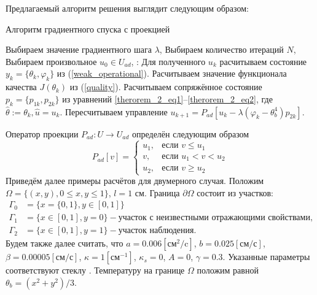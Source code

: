 \documentclass[10pt]{article}
\begin{document}
    Предлагаемый алгоритм решения выглядит следующим образом:
    \begin{algorithm}[H]
        \caption{Алгоритм градиентного спуска с проекцией}
        \begin{algorithmic}[1]
            \State Выбираем значение градиентного шага $\lambda$,
            \State Выбираем количество итераций $N$,
            \State Выбираем произвольное $u_0 \in U_{ad}$,
                :
                \State Для полученного $u_k$ расчитываем состояние $y_k = \{\theta_k, \varphi_k\}$ из  (\ref{weak_operational}).
                \State Расчитываем значение функционала качества $J(\theta_k)$ из (\ref{quality}).
                \State Расчитываем сопряжённое состояние $p_k=\{p_{1k},p_{2k}\}$ из уравнений \eqref{therorem_2_eq1}--\eqref{therorem_2_eq2}, где $ \hat{\theta} := \theta_k, \hat{u}=u_k$.
                \State Пересчитываем управление $u_{k+1} = P_{ad}\left[ u_k - \lambda (\varphi_k - \theta_b^4)p_{2k} \right]$.
            \EndFor
        \end{algorithmic}
    \end{algorithm}
    Оператор проекции $P_{ad} : U \to U_{ad}$ определён следующим образом
    \[
        P_{ad}[v] =
        \begin{cases}
            u_1, & \text{если } v \le u_1 \\
            v, & \text{если } u_1 < v < u_2 \\
            u_2, & \text{если } v \ge u_2
        \end{cases}
    \]
    Приведём далее примеры расчётов для двумерного случая.
    Положим $\Omega = \{(x,y), 0 \leq x,y \leq 1\}$, $l = 1$ см.
    Граница $\partial\Omega$ состоит из участков:
    \[
        \begin{aligned}
            \Gamma_0 & = \{x=\{0,1\}, y \in [0,1]\} \\
            \Gamma_1 & = \{x\in [0,1], y=0\} - \text{участок с неизвестными отражающими свойствами,} \\
            \Gamma_2 & = \{x \in [0,1], y=1\} - \text{участок наблюдения.}
        \end{aligned}
    \]
    Будем также далее считать, что $a = 0.006[\text{см}^2/\text{c}]$, $b=0.025[\text{см}/\text{с}]$, $\beta = 0.00005[\text{см}/\text{с}]$, $\kappa=1[\text{см}^{-1}]$, $\kappa_s = 0$, $A = 0$, $\gamma = 0.3$. Указанные параметры соответствуют стеклу \cite{grenkin_13}.
    Температуру на границе $\Omega$ положим равной $\theta_b = (x^2+y^2)/3$.
\end{document}
